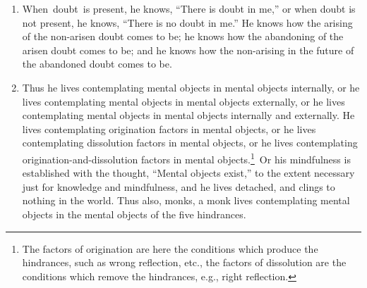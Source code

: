 \documentclass[a4 paper, 12pt]{article}
\begin{document}
\begin{enumerate}[resume]
\item When doubt is present, he knows, “There is doubt in me,” or when doubt is not present, he knows, “There is no doubt in me.” He knows how the arising of the non-arisen doubt comes to be; he knows how the abandoning of the arisen doubt comes to be; and he knows how the non-arising in the future of the abandoned doubt comes to be.
\item Thus he lives contemplating mental objects in mental objects internally, or he lives contemplating mental objects in mental objects externally, or he lives contemplating mental objects in mental objects internally and externally. He lives contemplating origination factors in mental objects, or he lives contemplating dissolution factors in mental objects, or he lives contemplating origination-and-dissolution factors in mental objects.\footnote{The factors of origination are here the conditions which produce the hindrances, such as wrong reflection, etc., the factors of dissolution are the conditions which remove the hindrances, e.g., right reflection.} Or his mindfulness is established with the thought, “Mental objects exist,” to the extent necessary just for knowledge and mindfulness, and he lives detached, and clings to nothing in the world. Thus also, monks, a monk lives contemplating mental objects in the mental objects of the five hindrances.
\end{enumerate}
\end{document}
